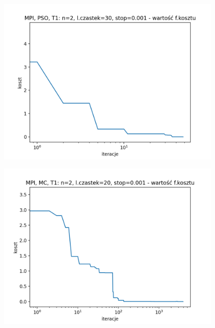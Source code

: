 \documentclass[11pt, a4paper, oneside]{article}
\begin{document}
\begin{figure}[H]
\centering
\begin{minipage}[b]{\dimexpr.5\textwidth-1em}
  \centering
  \includegraphics[width=1\linewidth]{grafiki2/MPI_PSO_T1/MPI_PSO_T1_koszt_monotoniczny.png}
  \label{fig:koszt:PSO1}
\end{minipage} \hfill
\begin{minipage}[b]{\dimexpr.5\textwidth-1em}
  \centering
  \includegraphics[width=1\linewidth]{grafiki2/MPI_MC_T1/MPI_MC_T1_koszt.png}
  \label{fig:koszt:MC1}
\end{minipage}
\end{figure}
\end{document}
